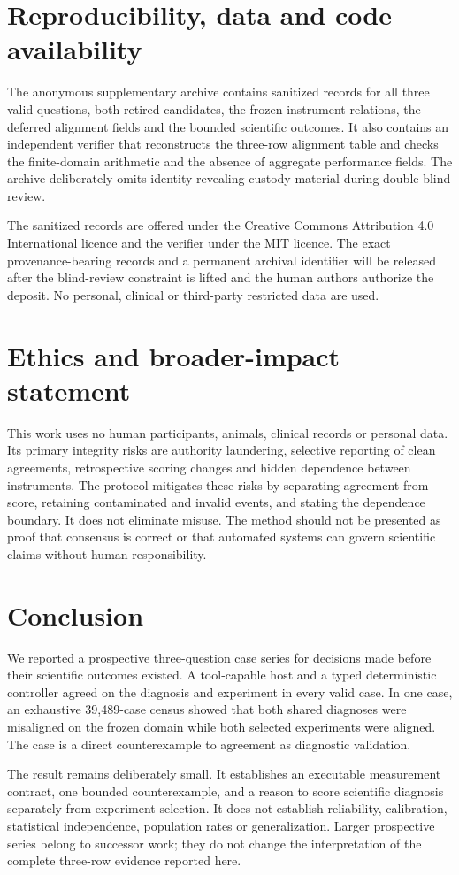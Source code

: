 \documentclass[10pt]{article}
\begin{document}
\section{Reproducibility, data and code availability}

The anonymous supplementary archive contains sanitized records for all three valid questions, both retired candidates, the frozen instrument relations, the deferred alignment fields and the bounded scientific outcomes. It also contains an independent verifier that reconstructs the three-row alignment table and checks the finite-domain arithmetic and the absence of aggregate performance fields. The archive deliberately omits identity-revealing custody material during double-blind review.

The sanitized records are offered under the Creative Commons Attribution 4.0 International licence and the verifier under the MIT licence. The exact provenance-bearing records and a permanent archival identifier will be released after the blind-review constraint is lifted and the human authors authorize the deposit. No personal, clinical or third-party restricted data are used.

\section{Ethics and broader-impact statement}

This work uses no human participants, animals, clinical records or personal data. Its primary integrity risks are authority laundering, selective reporting of clean agreements, retrospective scoring changes and hidden dependence between instruments. The protocol mitigates these risks by separating agreement from score, retaining contaminated and invalid events, and stating the dependence boundary. It does not eliminate misuse. The method should not be presented as proof that consensus is correct or that automated systems can govern scientific claims without human responsibility.

\section{Conclusion}

We reported a prospective three-question case series for decisions made before their scientific outcomes existed. A tool-capable host and a typed deterministic controller agreed on the diagnosis and experiment in every valid case. In one case, an exhaustive 39,489-case census showed that both shared diagnoses were misaligned on the frozen domain while both selected experiments were aligned. The case is a direct counterexample to agreement as diagnostic validation.

The result remains deliberately small. It establishes an executable measurement contract, one bounded counterexample, and a reason to score scientific diagnosis separately from experiment selection. It does not establish reliability, calibration, statistical independence, population rates or generalization. Larger prospective series belong to successor work; they do not change the interpretation of the complete three-row evidence reported here.



\end{document}
